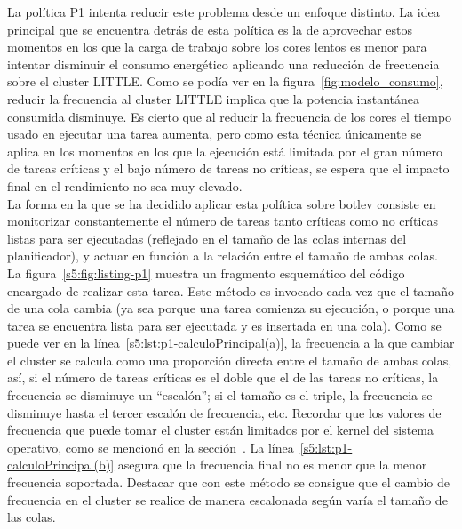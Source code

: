 La política P1 intenta reducir este problema desde un enfoque distinto. La
idea principal que se encuentra detrás de esta política es la de aprovechar
estos momentos en los que la carga de trabajo sobre los cores lentos es
menor para intentar disminuir el consumo energético aplicando una reducción
de frecuencia sobre el cluster LITTLE. Como se podía ver en la
figura~\ref{fig:modelo_consumo}, reducir la frecuencia al cluster LITTLE
implica que la potencia instantánea consumida disminuye. Es cierto que al
reducir la frecuencia de los cores el tiempo usado en ejecutar una tarea
aumenta, pero como esta técnica únicamente se aplica en los momentos en los
que la ejecución está limitada por el gran número de tareas críticas y el
bajo número de tareas no críticas, se espera que el impacto final en el
rendimiento no sea muy elevado.\\
La forma en la que se ha decidido aplicar esta política sobre botlev
consiste en monitorizar constantemente el número de tareas tanto críticas
como no críticas listas para ser ejecutadas (reflejado en el tamaño de las
colas internas del planificador), y actuar en función a la relación entre
el tamaño de ambas colas. La figura~\ref{s5:fig:listing-p1} muestra un
fragmento esquemático del código encargado de realizar esta tarea. Este
método es invocado cada vez que el tamaño de una cola cambia (ya sea porque
una tarea comienza su ejecución, o porque una tarea se encuentra lista para
ser ejecutada y es insertada en una cola). Como se puede ver en la
línea~\ref{s5:lst:p1-calculoPrincipal(a)}, la frecuencia a la que cambiar
el cluster se calcula como una proporción directa entre el tamaño de ambas
colas, así, si el número de tareas críticas es el doble que el de las
tareas no críticas, la frecuencia se disminuye un ``escalón''; si el tamaño
es el triple, la frecuencia se disminuye hasta el tercer escalón de
frecuencia, etc. Recordar que los valores de frecuencia que puede tomar el
cluster están limitados por el kernel del sistema operativo, como se
mencionó en la sección~. La
línea~\ref{s5:lst:p1-calculoPrincipal(b)} asegura que la frecuencia final
no es menor que la menor frecuencia soportada. Destacar que con este método
se consigue que el cambio de frecuencia en el cluster se realice de manera
escalonada según varía el tamaño de las colas.\\

